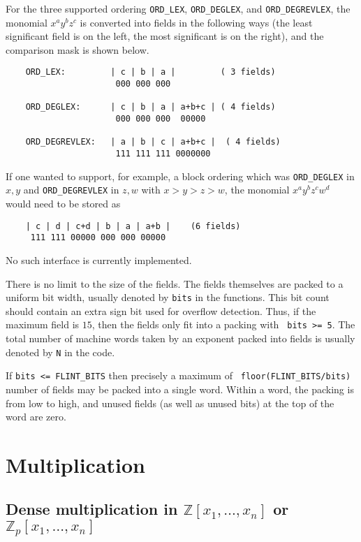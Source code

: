 \documentclass[11pt,reqno]{amsart}
\numberwithin{equation}{section}
\newcommand{\bbZ}[0]  { \mathbb{Z}}
\begin{document}
For the three supported ordering {\tt ORD\_LEX}, {\tt ORD\_DEGLEX}, and
{\tt ORD\_DEGREVLEX}, the
monomial $x^a y^b z^c$ is converted into fields in the following ways (the
least significant field is on the left, the most significant is on the right),
and the comparison mask is shown below.

\begin{verbatim}
    ORD_LEX:         | c | b | a |         ( 3 fields)
                      000 000 000

    ORD_DEGLEX:      | c | b | a | a+b+c | ( 4 fields)
                      000 000 000  00000

    ORD_DEGREVLEX:   | a | b | c | a+b+c |  ( 4 fields)
                      111 111 111 0000000
\end{verbatim}

If one wanted to support, for example, a block ordering which was {\tt ORD\_DEGLEX}
in $x, y$ and {\tt ORD\_DEGREVLEX} in $z, w$ with $x>y>z>w$,
the monomial $x^a y^b z^c w^d$ would need to be stored as

\begin{verbatim}
    | c | d | c+d | b | a | a+b |    (6 fields)
     111 111 00000 000 000 00000
\end{verbatim}

No such interface is currently implemented.


There is no limit to the size of the fields. The fields themselves are packed
to a uniform bit width, usually denoted by {\tt bits} in the functions. This
bit count should contain an extra sign bit used for overflow detection. Thus,
if the maximum field is $15$, then the fields only fit into a packing with {\tt
bits >= 5}. The total number of machine words taken by an exponent packed into
fields is usually denoted by {\tt N} in the code.

If {\tt bits <= FLINT\_BITS} then precisely a maximum of {\tt
floor(FLINT\_BITS/bits)} number of fields may be packed into a single word.
Within a word, the packing is from low to high, and unused fields (as well as
unused bits) at the top of the word are zero.

\section{Multiplication}
\subsection{Dense multiplication in $\bbZ[x_1,\dots,x_n]$ or
$\bbZ_p[x_1,\dots,x_n]$}\
\end{document}
